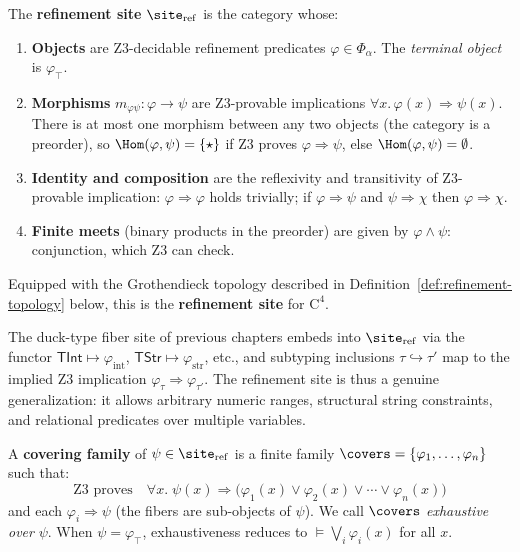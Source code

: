 \begin{definition}
\label{def:refinement-site}
The \textbf{refinement site} $\site_{\mathrm{ref}}$ is the category whose:
\begin{enumerate}
\item \textbf{Objects} are Z3-decidable refinement predicates
  $\varphi \in \Phi_\alpha$.  The \emph{terminal object} is $\varphi_\top$.
\item \textbf{Morphisms} $m_{\varphi\psi} : \varphi \to \psi$ are
  Z3-provable implications $\forall x.\,\varphi(x) \Rightarrow \psi(x)$.
  There is at most one morphism between any two objects (the category is a
  preorder), so $\Hom(\varphi, \psi) = \{\star\}$ if Z3 proves
  $\varphi \Rightarrow \psi$, else $\Hom(\varphi,\psi) = \emptyset$.
\item \textbf{Identity and composition} are the reflexivity and
  transitivity of Z3-provable implication: $\varphi \Rightarrow \varphi$
  holds trivially; if $\varphi \Rightarrow \psi$ and $\psi \Rightarrow
  \chi$ then $\varphi \Rightarrow \chi$.
\item \textbf{Finite meets} (binary products in the preorder) are given
  by $\varphi \wedge \psi$: conjunction, which Z3 can check.
\end{enumerate}
Equipped with the Grothendieck topology described in
Definition~\ref{def:refinement-topology} below, this is the
\textbf{refinement site} for $\mathrm{C}^4$.
\end{definition}

\begin{remark}
The duck-type fiber site of previous chapters embeds into
$\site_{\mathrm{ref}}$ via the functor
$\mathsf{TInt} \mapsto \varphi_{\mathrm{int}}$,
$\mathsf{TStr} \mapsto \varphi_{\mathrm{str}}$, etc., and subtyping
inclusions $\tau \hookrightarrow \tau'$ map to the implied Z3 implication
$\varphi_\tau \Rightarrow \varphi_{\tau'}$.  The refinement site is thus
a genuine generalization: it allows arbitrary numeric ranges, structural
string constraints, and relational predicates over multiple variables.
\end{remark}

\begin{definition}
\label{def:refinement-topology}
A \textbf{covering family} of $\psi \in \site_{\mathrm{ref}}$ is a finite
family $\covers = \{\varphi_1, \ldots, \varphi_n\}$ such that:
\[
  \text{Z3 proves}\quad \forall x.\;\psi(x) \Rightarrow
  \bigl(\varphi_1(x) \vee \varphi_2(x) \vee \cdots \vee \varphi_n(x)\bigr)
\]
and each $\varphi_i \Rightarrow \psi$ (the fibers are sub-objects of $\psi$).
We call $\covers$ \emph{exhaustive over} $\psi$.  When $\psi = \varphi_\top$,
exhaustiveness reduces to $\vDash \bigvee_i \varphi_i(x)$ for all $x$.
\end{definition}

